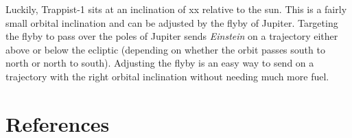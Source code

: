 \documentclass[12pt]{article} %
\begin{document}
Luckily, Trappist-1 sits at an inclination of xx relative to the sun. This is a fairly small orbital inclination and can be adjusted by the flyby of Jupiter. Targeting the flyby to pass over the poles of Jupiter sends \textit{Einstein} on a trajectory either above or below the ecliptic (depending on whether the orbit passes south to north or north to south). Adjusting the flyby is an easy way to send  on a trajectory with the right orbital inclination without needing much more fuel.

\section{References}
\end{document}
